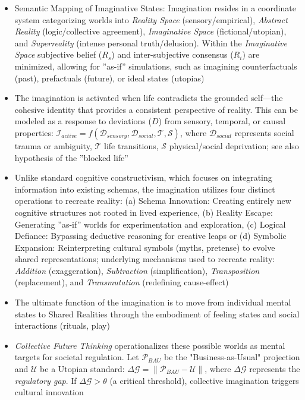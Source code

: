 \documentclass[jou,floatsintext]{apa7}
\begin{document}
\begin{itemize}
\begin{itemize}
    \begin{itemize}
        \item Semantic Mapping of Imaginative States: Imagination resides in a coordinate system categorizing worlds into \textit{Reality Space} (sensory/empirical), \textit{Abstract Reality} (logic/collective agreement), \textit{Imaginative Space} (fictional/utopian), and \textit{Superreality} (intense personal truth/delusion). Within the \textit{Imaginative Space} subjective belief ($R_s$) and inter-subjective consensus ($R_i$) are minimized, allowing for ''as-if'' simulations, such as imagining counterfactuals (past), prefactuals (future), or ideal states (utopias) 
        \item[$\rightarrow$] The imagination is activated when life contradicts the grounded self---the cohesive identity that provides a consistent perspective of reality. This can be modeled as a response to deviations ($D$) from sensory, temporal, or causal properties: $\mathcal{I}_{active} = f(\mathcal{D}_{sensory}, \mathcal{D}_{social}, \mathcal{T}, \mathcal{S})$, where $\mathcal{D}_{social}$ represents social trauma or ambiguity,  $\mathcal{T}$ life transitions, $\mathcal{S}$ physical/social deprivation; see also hypothesis of the ''blocked life'' \parencite{amlingerZerstoerungslustElementeDemokratischen2025}
        \item Unlike standard cognitive constructivism, which focuses on integrating information into existing schemas, the imagination utilizes four distinct operations to recreate reality: (a) Schema Innovation: Creating entirely new cognitive structures not rooted in lived experience, (b) Reality Escape: Generating ''as-if'' worlds for experimentation and exploration, (c) Logical Defiance: Bypassing deductive reasoning for creative leaps or (d) Symbolic Expansion: Reinterpreting cultural symbols (myths, pretense) to evolve shared representations; underlying mechanisms used to recreate reality: \textit{Addition} (exaggeration), \textit{Subtraction} (simplification), \textit{Transposition} (replacement), and \textit{Transmutation} (redefining cause-effect)
        \item[$\rightarrow$] The ultimate function of the imagination is to move from individual mental states to Shared Realities through the embodiment of feeling states and social interactions (rituals, play)
        \item \textit{Collective Future Thinking} operationalizes these possible worlds as mental targets for societal regulation. Let $\mathcal{P}_{BAU}$ be the "Business-as-Usual" projection and $\mathcal{U}$ be a Utopian standard: $\Delta \mathcal{G} = \| \mathcal{P}_{BAU} - \mathcal{U} \|$, where $\Delta \mathcal{G}$ represents the \textit{regulatory gap}. If $\Delta \mathcal{G} > \theta$ (a critical threshold), collective imagination triggers cultural innovation \parencite{kashimaCollectiveFutureThinking2025}
    \end{itemize}


\end{itemize}
\end{itemize}
\end{document}

